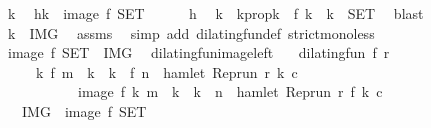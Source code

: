 \begin{isabellebody}
\ k\ \isamarkupfalse%
\ h{\isacharcolon}{\isacartoucheopen}k\ {\isasymin}\ image\ f\ {\isacharquery}SET{\isacartoucheclose}\isanewline
\ \ \ \ \isamarkupfalse%
\ h\ \isamarkupfalse%
\ k\ \ k{}prop{\isacharcolon}{\isacartoucheopen}k\ {\isacharequal}\ f\ k\ {\isasymand}\ k\ {\isasymin}\ {\isacharquery}SET{\isacartoucheclose}\ \isamarkupfalse%
\ blast\isanewline
\ \ \ \ \isamarkupfalse%
\ {\isacartoucheopen}k\ {\isasymin}\ {\isacharquery}IMG{\isacartoucheclose}\ \isamarkupfalse%
\ assms\ \isamarkupfalse%
\ {\isacharparenleft}simp\ add{\isacharcolon}\ dilating{\isacharunderscore}fun{\isacharunderscore}def\ strict{\isacharunderscore}mono{\isacharunderscore}less{\isacharparenright}\isanewline
\ \ \isacommand{{\isacharbraceright}}\isamarkupfalse%
\ \isamarkupfalse%
\ {\isacartoucheopen}image\ f\ {\isacharquery}SET\ {\isasymsubseteq}\ {\isacharquery}IMG{\isacartoucheclose}\ \isacommand{{\isachardot}{\isachardot}}\isamarkupfalse%
\isanewline
{}\isamarkupfalse%
%
\endisatagproof
{\isafoldproof}%
%
\isadelimproof
\isanewline
%
\endisadelimproof
\isanewline
{}\isamarkupfalse%
\ dilating{\isacharunderscore}fun{\isacharunderscore}image{\isacharunderscore}left{\isacharcolon}\isanewline
\ \ \ {\isacartoucheopen}dilating{\isacharunderscore}fun\ f\ r{\isacartoucheclose}\isanewline
\ \ \ \ \ {\isacartoucheopen}{\isacharbraceleft}k{\isachardot}\ f\ m\ {\isasymle}\ k\ {\isasymand}\ k\ {\isacharless}\ f\ n\ {\isasymand}\ hamlet\ {\isacharparenleft}{\isacharparenleft}Rep{\isacharunderscore}run\ r{\isacharparenright}\ k\ c{\isacharparenright}{\isacharbraceright}\isanewline
\ \ \ \ \ \ \ \ \ \ {\isacharequal}\ image\ f\ {\isacharbraceleft}k{\isachardot}\ m\ {\isasymle}\ k\ {\isasymand}\ k\ {\isacharless}\ n\ {\isasymand}\ hamlet\ {\isacharparenleft}{\isacharparenleft}Rep{\isacharunderscore}run\ r{\isacharparenright}\ {\isacharparenleft}f\ k{\isacharparenright}\ c{\isacharparenright}{\isacharbraceright}{\isacartoucheclose}\isanewline
\ \ {\isacharparenleft}\ {\isacartoucheopen}{\isacharquery}IMG\ {\isacharequal}\ image\ f\ {\isacharquery}SET{\isacartoucheclose}{\isacharparenright}\isanewline
%
\isadelimproof
%
\endisadelimproof
%
\isatagproof
{}\isamarkupfalse%
\isanewline
\ \ \isacommand{{\isacharbraceleft}}\isamarkupfalse%
\ \isamarkupfalse%

\end{isabellebody}
